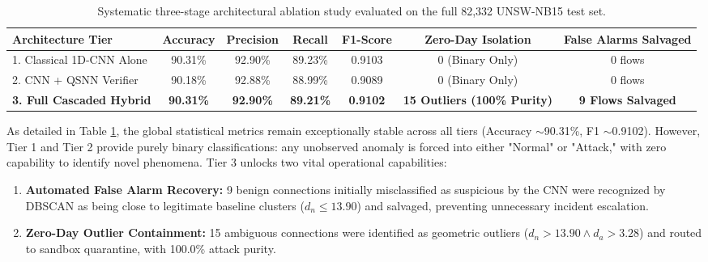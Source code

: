 \documentclass[preprint,12pt]{elsarticle}
\begin{document}
\begin{table}[t]
\centering
\caption{Systematic three-stage architectural ablation study evaluated on the full 82,332 UNSW-NB15 test set.}
\label{tab:ablation_study}
\small
\begin{tabular}{lcccccc}
\toprule
\textbf{Architecture Tier} & \textbf{Accuracy} & \textbf{Precision} & \textbf{Recall} & \textbf{F1-Score} & \textbf{Zero-Day Isolation} & \textbf{False Alarms Salvaged} \\
\midrule
1. Classical 1D-CNN Alone       & 90.31\% & 92.90\% & 89.23\% & 0.9103 & 0 (Binary Only) & 0 flows \\
2. CNN + QSNN Verifier          & 90.18\% & 92.88\% & 88.99\% & 0.9089 & 0 (Binary Only) & 0 flows \\
\textbf{3. Full Cascaded Hybrid} & \textbf{90.31\%} & \textbf{92.90\%} & \textbf{89.21\%} & \textbf{0.9102} & \textbf{15 Outliers (100\% Purity)} & \textbf{9 Flows Salvaged} \\
\bottomrule
\end{tabular}
\end{table}

As detailed in Table \ref{tab:ablation_study}, the global statistical metrics remain exceptionally stable across all tiers (Accuracy $\sim$90.31\%, F1 $\sim$0.9102). However, Tier 1 and Tier 2 provide purely binary classifications: any unobserved anomaly is forced into either "Normal" or "Attack," with zero capability to identify novel phenomena. Tier 3 unlocks two vital operational capabilities:
\begin{enumerate}
    \item \textbf{Automated False Alarm Recovery:} 9 benign connections initially misclassified as suspicious by the CNN were recognized by DBSCAN as being close to legitimate baseline clusters ($d_n \le 13.90$) and salvaged, preventing unnecessary incident escalation.
    \item \textbf{Zero-Day Outlier Containment:} 15 ambiguous connections were identified as geometric outliers ($d_n > 13.90 \land d_a > 3.28$) and routed to sandbox quarantine, with 100.0\% attack purity.
\end{enumerate}
\end{document}
